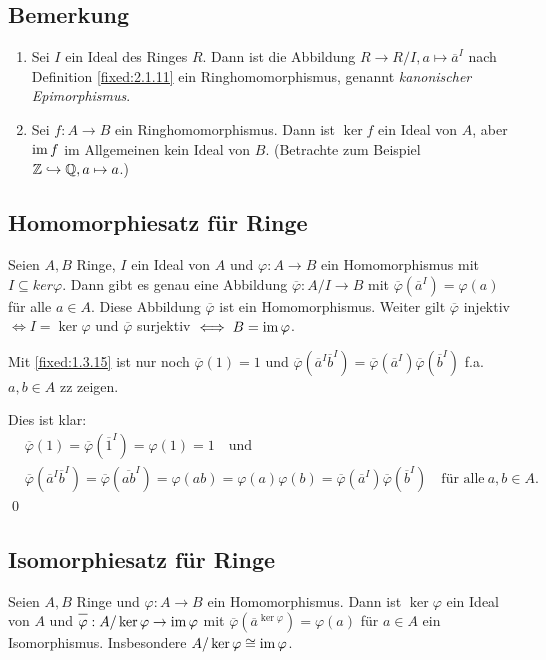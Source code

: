 \subsection{Bemerkung}
\begin{enumerate}[label=(\alph*)]
	\item
		Sei $I$ ein Ideal des Ringes $R$. Dann ist die Abbildung $R \to R/I, a \mapsto \overline{a}^I$ nach Definition \ref{fixed:2.1.11} ein Ringhomomorphismus, genannt \emph{kanonischer Epimorphismus}.
		
	\item
		Sei $f: A \to B$ ein Ringhomomorphismus. Dann ist $\ker f$ ein Ideal von $A$, aber $\operatorname{im} f$ im Allgemeinen kein Ideal von $B$. (Betrachte zum Beispiel $\Z \MAPmono \Q, a \mapsto a$.)
\end{enumerate}

\subsection{Homomorphiesatz für Ringe}
	Seien $A, B$ Ringe, $I$ ein Ideal von $A$ und $\varphi: A \to B$ ein Homomorphismus mit $I \subseteq ker \varphi$. Dann gibt es genau eine Abbildung $\overline{\varphi}: A/I \to B$ mit $\overline{\varphi}(\overline{a}^I)=\varphi(a)$ für alle $a \in A$. Diese Abbildung $\overline{\varphi}$ ist ein Homomorphismus. Weiter gilt $\overline{\varphi}$ injektiv $\iff I = \ker \varphi$ und $\overline{\varphi}$ surjektiv $\iff B = \operatorname{im} \varphi$.
 
\proof Mit \ref{fixed:1.3.15} ist nur noch $\overline{\varphi}(1)=1$ und $\overline{\varphi}(\overline{a}^I \overline{b}^I) = \overline{\varphi}(\overline{a}^I) \overline{\varphi}(\overline{b}^I)$ f.a. $a,b\in A$ zz zeigen.

Dies ist klar:
\begin{align*}
  &\overline{\varphi}(1)=\overline{\varphi}(\overline{1}^I)=\varphi(1)=1 \quad\text{und} \\
  &\overline{\varphi}(\overline{a}^I \overline{b}^I)=\overline{\varphi}(\overline{ab}^I)=\varphi(ab)=\varphi(a)\varphi(b)=
  \overline{\varphi}(\overline{a}^I)\overline{\varphi}(\overline{b}^I) \quad\text{für alle}~ a,b\in A. 
\end{align*}
\qed
 
\subsection{Isomorphiesatz für Ringe} Seien $A, B$ Ringe und $\varphi: A \to B$ ein Homomorphismus. Dann ist $\ker \varphi$ ein Ideal von $A$ und $\overline{\varphi}: A/\ker\varphi \to \im\varphi$ mit $\overline{\varphi}(\overline{a}^{\ker \varphi})=\varphi(a)$ für $a \in A$ ein Isomorphismus. Insbesondere $A/\ker\varphi \cong \operatorname{im} \varphi$.
 
